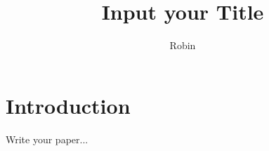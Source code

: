 \documentclass[a4paper]{article}
\author{Robin}
\title{Input your Title }
\date{}
\begin{document}
\maketitle
\tableofcontents
\section{Introduction}
Write your paper...



\cite{zuckerman2001makes}
\cite{2001}


\end{document}
